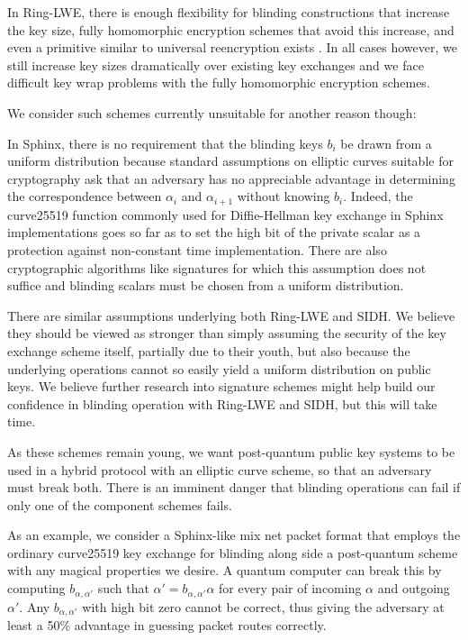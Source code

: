 \documentclass[twoside,letterpaper]{llncs}
\begin{document}
In Ring-LWE, there is enough flexibility for blinding constructions
that increase the key size, fully homomorphic encryption schemes that
avoid this increase, and even a primitive similar to universal
reencryption exists \cite{963628}.  In all cases however, we still
increase key sizes dramatically over existing key exchanges and we face
difficult key wrap problems with the fully homomorphic encryption
schemes.

\smallskip

We consider such schemes currently unsuitable for another reason though: 

In Sphinx, there is no requirement that the blinding keys $b_i$ be
drawn from a uniform distribution because standard assumptions on
elliptic curves suitable for cryptography ask that an adversary has
no appreciable advantage in determining the correspondence between
$\alpha_i$ and $\alpha_{i+1}$ without knowing $b_i$.  
Indeed, the curve25519 function commonly used for Diffie-Hellman key
exchange in Sphinx implementations goes so far as to set the high bit
of the private scalar as a protection against non-constant time
implementation.
There are also cryptographic algorithms like signatures for which
this assumption does not suffice and blinding scalars must be chosen
from a uniform distribution.

There are similar assumptions underlying both Ring-LWE and SIDH.
We believe they should be viewed as stronger than simply assuming the
security of the key exchange scheme itself, partially due to their
youth, but also because the underlying operations cannot so easily
yield a uniform distribution on public keys.  We believe further
research into signature schemes might help build our confidence in
blinding operation with Ring-LWE and SIDH, but this will take time.

As these schemes remain young, we want post-quantum public key
systems to be used in a hybrid protocol with an elliptic curve scheme,
so that an adversary must break both.  There is an imminent danger
that blinding operations can fail if only one of the component schemes
fails.

As an example, we consider a Sphinx-like mix net packet format that
employs the ordinary curve25519 key exchange for blinding along side
a post-quantum scheme with any magical properties we desire.  
A quantum computer can break this by computing $b_{\alpha,\alpha'}$
such that $\alpha' = b_{\alpha,\alpha'} \alpha$ for every pair of
incoming $\alpha$ and outgoing $\alpha'$.  Any $b_{\alpha,\alpha'}$
with high bit zero cannot be correct, thus giving the adversary at
least a 50\% advantage in guessing packet routes correctly.
\end{document}
